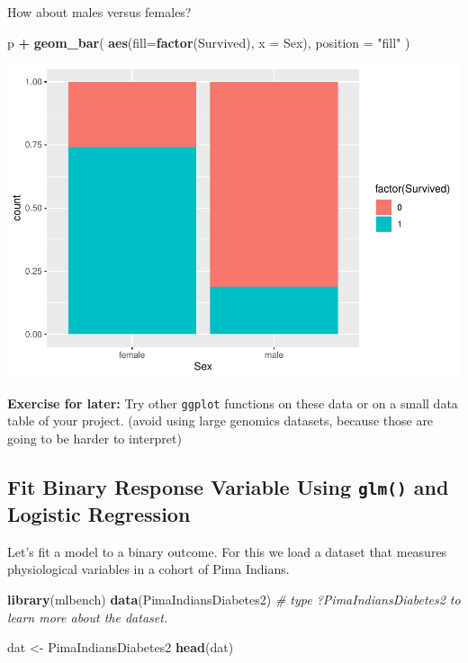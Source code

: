 \documentclass[
]{book}
\newenvironment{Shaded}{\begin{snugshade}}{\end{snugshade}}
\newcommand{\AttributeTok}[1]{\textcolor[rgb]{0.13,0.29,0.53}{#1}}
\newcommand{\CommentTok}[1]{\textcolor[rgb]{0.56,0.35,0.01}{\textit{#1}}}
\newcommand{\FunctionTok}[1]{\textcolor[rgb]{0.13,0.29,0.53}{\textbf{#1}}}
\newcommand{\NormalTok}[1]{#1}
\newcommand{\OtherTok}[1]{\textcolor[rgb]{0.56,0.35,0.01}{#1}}
\newcommand{\SpecialCharTok}[1]{\textcolor[rgb]{0.81,0.36,0.00}{\textbf{#1}}}
\newcommand{\StringTok}[1]{\textcolor[rgb]{0.31,0.60,0.02}{#1}}
\begin{document}
How about males versus females?

\begin{Shaded}
\begin{Highlighting}[]
\NormalTok{p }\SpecialCharTok{+} \FunctionTok{geom\_bar}\NormalTok{(}
    \FunctionTok{aes}\NormalTok{(}\AttributeTok{fill=}\FunctionTok{factor}\NormalTok{(Survived), }\AttributeTok{x =}\NormalTok{ Sex),}
    \AttributeTok{position =} \StringTok{"fill"}
\NormalTok{)}
\end{Highlighting}
\end{Shaded}

\includegraphics{_main_files/figure-latex/finish-titanic-1.pdf}

\textbf{Exercise for later:} Try other \texttt{ggplot} functions on these data or on a small data table of your project.
(avoid using large genomics datasets, because those are going to be harder to interpret)

\subsection{\texorpdfstring{Fit Binary Response Variable Using \texttt{glm()} and Logistic Regression}{Fit Binary Response Variable Using glm() and Logistic Regression}}\label{fit-binary-response-variable-using-glm-and-logistic-regression}

Let's fit a model to a binary outcome. For this we load a dataset that measures physiological variables in a cohort of Pima Indians.

\begin{Shaded}
\begin{Highlighting}[]
\FunctionTok{library}\NormalTok{(mlbench)}
\FunctionTok{data}\NormalTok{(PimaIndiansDiabetes2)}
\CommentTok{\# type ?PimaIndiansDiabetes2 to learn more about the dataset.}

\NormalTok{dat }\OtherTok{\textless{}{-}}\NormalTok{ PimaIndiansDiabetes2}
\FunctionTok{head}\NormalTok{(dat)}
\end{Highlighting}
\end{Shaded}
\end{document}
